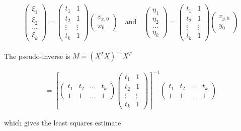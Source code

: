 \[\begin{aligned}
\begin{pmatrix} \xi_1 \\ \xi_2 \\ \dots \\ \xi_k \end{pmatrix} = \begin{pmatrix} t_1 & 1 \\ t_2 & 1 \\ \vdots & \vdots \\ t_k & 1 \end{pmatrix} \begin{pmatrix}  v_{x,0} \\ x_0 \end{pmatrix}
\quad \mbox{and} \quad
\begin{pmatrix} \eta_1 \\ \eta_2 \\ \dots \\ \eta_k \end{pmatrix} = \begin{pmatrix} t_1 & 1 \\ t_2 & 1 \\ \vdots & \vdots \\ t_k & 1 \end{pmatrix} \begin{pmatrix}  v_{y,0} \\ y_0 \end{pmatrix}
\end{aligned}\]

The pseudo-inverse is \(M = (X^T X)^{-1} X^T\)

\[\begin{aligned}
=  \left[\begin{pmatrix} t_1 & t_2 & \dots & t_k  \\ 1 & 1 & \dots & 1\end{pmatrix} \begin{pmatrix} t_1 & 1 \\ t_2 & 1 \\ \vdots & \vdots \\ t_k & 1 \end{pmatrix} \right]^{-1}
\begin{pmatrix} t_1 & t_2 & \dots & t_k  \\ 1 & 1 & \dots & 1\end{pmatrix}
\end{aligned}\]

which gives the least squares estimate


